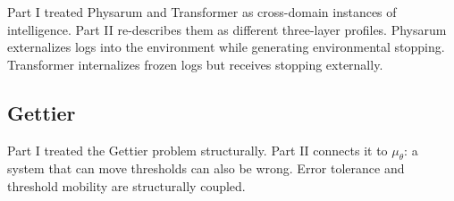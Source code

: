 Part I treated Physarum and Transformer as cross-domain instances of intelligence. Part II re-describes them as different three-layer profiles. Physarum externalizes logs into the environment while generating environmental stopping. Transformer internalizes frozen logs but receives stopping externally.

\subsection{Gettier}

Part I treated the Gettier problem structurally. Part II connects it to $\mu_\theta$: a system that can move thresholds can also be wrong. Error tolerance and threshold mobility are structurally coupled.

\bigskip
